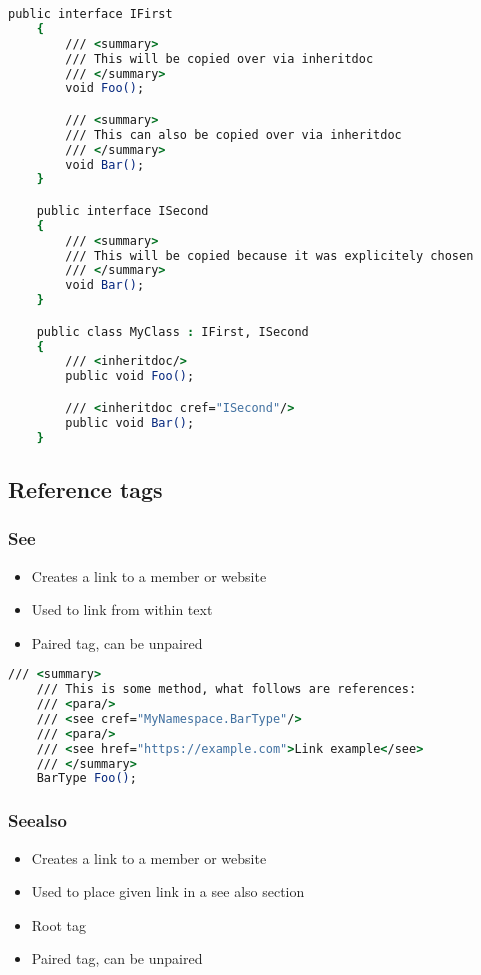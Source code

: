\begin{lstlisting}[language=csh]
    public interface IFirst
    {
        /// <summary>
        /// This will be copied over via inheritdoc
        /// </summary>
        void Foo();

        /// <summary>
        /// This can also be copied over via inheritdoc
        /// </summary>
        void Bar();
    }

    public interface ISecond
    {
        /// <summary>
        /// This will be copied because it was explicitely chosen
        /// </summary>
        void Bar();
    }

    public class MyClass : IFirst, ISecond
    {
        /// <inheritdoc/>
        public void Foo();

        /// <inheritdoc cref="ISecond"/>
        public void Bar();
    }

\end{lstlisting}

\subsection{Reference tags}

\subsubsection*{See}
\begin{itemize}
    \item Creates a link to a member or website
    \item Used to link from within text
    \item Paired tag, can be unpaired
\end{itemize}

\begin{lstlisting}[language=csh]
    /// <summary>
    /// This is some method, what follows are references:
    /// <para/>
    /// <see cref="MyNamespace.BarType"/>
    /// <para/>
    /// <see href="https://example.com">Link example</see>
    /// </summary>
    BarType Foo();
\end{lstlisting}

\subsubsection*{Seealso}
\begin{itemize}
    \item Creates a link to a member or website
    \item Used to place given link in a see also section
    \item Root tag
    \item Paired tag, can be unpaired
\end{itemize}


